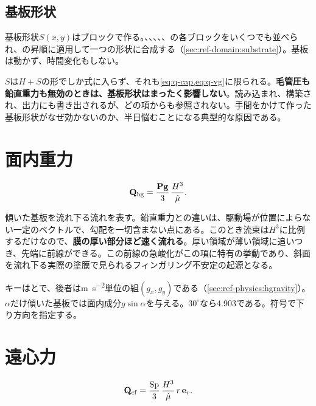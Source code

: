 \subsection*{基板形状}

基板形状$S(x,y)$はブロックで作る。、、、、、の各ブロックをいくつでも並べられ、の昇順に適用して一つの形状に合成する（\cref{sec:ref-domain:substrate}）。基板は動かず、時間変化もしない。

$S$は$H+S$の形でしか式に入らず、それも\cref{eq:q-cap,eq:q-vg}に限られる。\textbf{毛管圧も鉛直重力も無効のときは、基板形状はまったく影響しない}。読み込まれ、構築され、出力にも書き出されるが、どの項からも参照されない。手間をかけて作った基板形状がなぜ効かないのか、半日悩むことになる典型的な原因である。

\section{面内重力}
\label{sec:terms:hgravity}

\begin{equation}\label{eq:q-hg}
  \mathbf{Q}_{\mathrm{hg}} = \frac{\mathbf{Pg}}{3}\,\frac{H^{3}}{\hat{\mu}}.
\end{equation}

傾いた基板を流れ下る流れを表す。鉛直重力との違いは、駆動場が位置によらない一定のベクトルで、勾配を一切含まない点にある。このとき流束は$H^{3}$に比例するだけなので、\textbf{膜の厚い部分ほど速く流れる}。厚い領域が薄い領域に追いつき、先端に前線ができる。この前線の急峻化がこの項に特有の挙動であり、斜面を流れ下る実際の塗膜で見られるフィンガリング不安定の起源となる。

キーはとで、後者は\si{\metre\per\second\squared}単位の組$(g_x, g_y)$である（\cref{sec:ref-physics:hgravity}）。$\alpha$だけ傾いた基板では面内成分$g\sin\alpha$を与える。$30^\circ$なら\num{4.903}である。符号で下り方向を指定する。

\section{遠心力}
\label{sec:terms:centrifugal}

\begin{equation}\label{eq:q-cf}
  \mathbf{Q}_{\mathrm{cf}} = \frac{\mathrm{Sp}}{3}\,\frac{H^{3}}{\hat{\mu}}\,r\,\mathbf{e}_r.
\end{equation}

